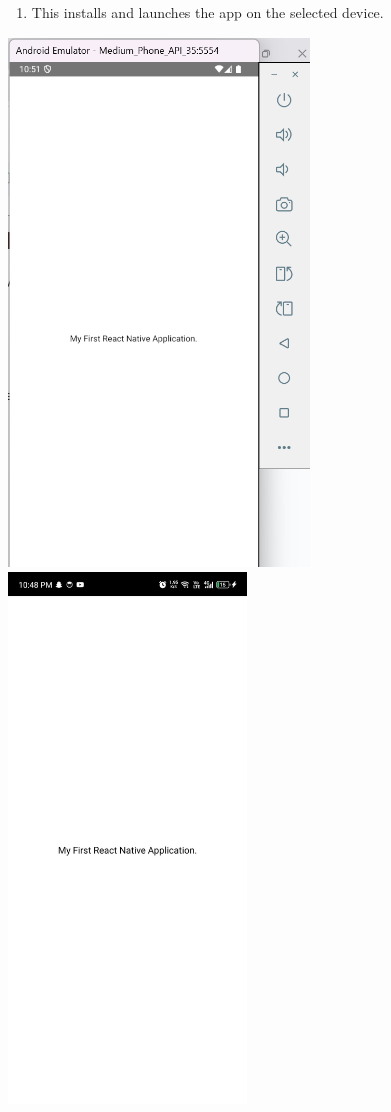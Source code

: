 \documentclass{article}
\begin{document}
\begin{enumerate}
    \item This installs and launches the app on the selected device.
\end{enumerate}
\includegraphics[width=3.14063in,height=5.53233in]{media/image5.png}
\includegraphics[width=2.49141in,height=5.53646in]{media/image6.jpg}
\end{document}
